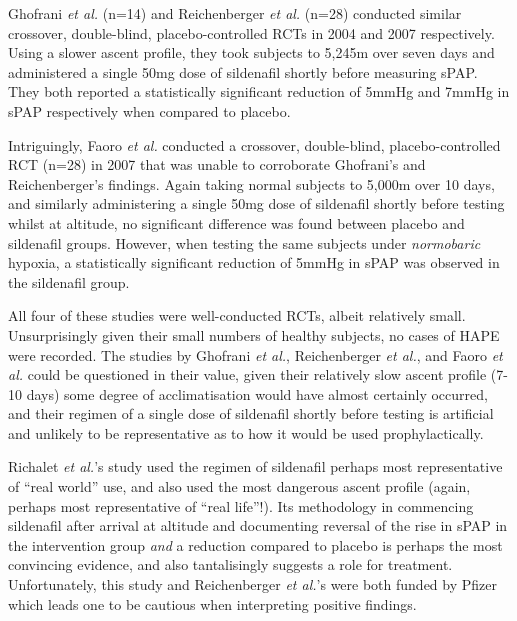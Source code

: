 \documentclass[10pt,a4paper]{article}
\begin{document}
Ghofrani \emph{et al.}\cite{Ghofrani:2004gp} (n=14) and Reichenberger \emph{et al.}\cite{Reichenberger:2007bw} (n=28) conducted similar crossover, double-blind, placebo-controlled RCTs in 2004 and 2007 respectively. Using a slower ascent profile, they took subjects to 5,245m over seven days and administered a single 50mg dose of sildenafil shortly before measuring sPAP. They both reported a statistically significant reduction of 5mmHg and 7mmHg in sPAP respectively when compared to placebo.

Intriguingly, Faoro \emph{et al.} conducted a crossover, double-blind, placebo-controlled RCT (n=28) in 2007 that was unable to corroborate Ghofrani's and Reichenberger's findings. Again taking normal subjects to 5,000m over 10 days, and similarly administering a single 50mg dose of sildenafil shortly before testing whilst at altitude, no significant difference was found between placebo and sildenafil groups.\cite{Faoro:2007ji} However, when testing the same subjects under \emph{normobaric} hypoxia, a statistically significant reduction of 5mmHg in sPAP was observed in the sildenafil group.\cite{Faoro:2007ji}

All four of these studies were well-conducted RCTs, albeit relatively small. Unsurprisingly given their small numbers of healthy subjects, no cases of HAPE were recorded. The studies by Ghofrani \emph{et al.},\cite{Ghofrani:2004gp} Reichenberger \emph{et al.},\cite{Reichenberger:2007bw} and Faoro \emph{et al.}\cite{Faoro:2007ji} could be questioned in their value, given their relatively slow ascent profile (7-10 days) some degree of acclimatisation would have almost certainly occurred, and their regimen of a single dose of sildenafil shortly before testing is artificial and unlikely to be representative as to how it would be used prophylactically.

Richalet \emph{et al.}'s study\cite{Richalet:2005el} used the regimen of sildenafil perhaps most representative of ``real world'' use, and also used the most dangerous ascent profile (again, perhaps most representative of ``real life''!). Its methodology in commencing sildenafil after arrival at altitude and documenting reversal of the rise in sPAP in the intervention group \emph{and} a reduction compared to placebo is perhaps the most convincing evidence, and also tantalisingly suggests a role for treatment. Unfortunately, this study and Reichenberger \emph{et al.}'s\cite{Reichenberger:2007bw} were both funded by Pfizer which leads one to be cautious when interpreting positive findings.
\end{document}
